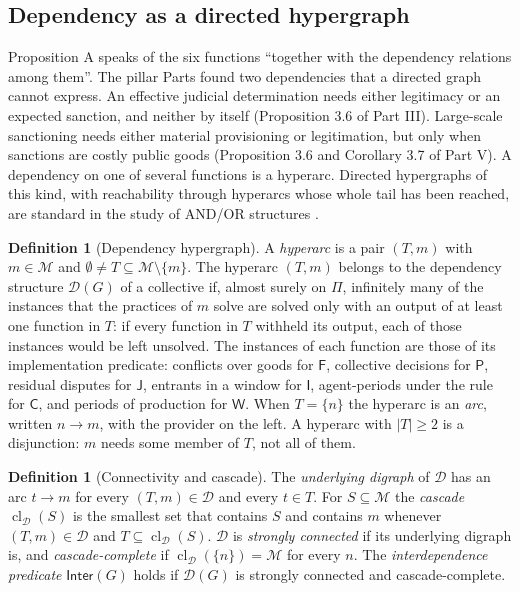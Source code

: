 \documentclass[11pt,letterpaper]{article}
\theoremstyle{definition}
\newtheorem{definition}[theorem]{Definition}
\theoremstyle{remark}
\newcommand{\pF}{\mathsf{F}}
\newcommand{\pP}{\mathsf{P}}
\newcommand{\pJ}{\mathsf{J}}
\newcommand{\pI}{\mathsf{I}}
\newcommand{\pC}{\mathsf{C}}
\newcommand{\pW}{\mathsf{W}}
\newcommand{\Mset}{\mathcal{M}}
\newcommand{\Inter}{\mathsf{Inter}}
\newcommand{\cl}{\operatorname{cl}}
\begin{document}
\subsection{Dependency as a directed hypergraph}

Proposition A speaks of the six functions ``together with the dependency relations among them''. The pillar Parts found two dependencies that a directed graph cannot express. An effective judicial determination needs either legitimacy or an expected sanction, and neither by itself (Proposition 3.6 of Part III). Large-scale sanctioning needs either material provisioning or legitimation, but only when sanctions are costly public goods (Proposition 3.6 and Corollary 3.7 of Part V). A dependency on one of several functions is a hyperarc. Directed hypergraphs of this kind, with reachability through hyperarcs whose whole tail has been reached, are standard in the study of AND/OR structures \citep{gallo1993}.

\begin{definition}[Dependency hypergraph]
\label{def:formalized-state:hypergraph}
A \emph{hyperarc} is a pair $(T,m)$ with $m\in\Mset$ and $\emptyset\neq T\subseteq\Mset\setminus\{m\}$. The hyperarc $(T,m)$ belongs to the dependency structure $\mathcal{D}(G)$ of a collective if, almost surely on $\Pi$, infinitely many of the instances that the practices of $m$ solve are solved only with an output of at least one function in $T$: if every function in $T$ withheld its output, each of those instances would be left unsolved. The instances of each function are those of its implementation predicate: conflicts over goods for $\pF$, collective decisions for $\pP$, residual disputes for $\pJ$, entrants in a window for $\pI$, agent-periods under the rule for $\pC$, and periods of production for $\pW$. When $T=\{n\}$ the hyperarc is an \emph{arc}, written $n\to m$, with the provider on the left. A hyperarc with $|T|\ge2$ is a disjunction: $m$ needs some member of $T$, not all of them.
\end{definition}

\begin{definition}[Connectivity and cascade]
\label{def:formalized-state:cascade}
The \emph{underlying digraph} of $\mathcal{D}$ has an arc $t\to m$ for every $(T,m)\in\mathcal{D}$ and every $t\in T$. For $S\subseteq\Mset$ the \emph{cascade} $\cl_{\mathcal{D}}(S)$ is the smallest set that contains $S$ and contains $m$ whenever $(T,m)\in\mathcal{D}$ and $T\subseteq\cl_{\mathcal{D}}(S)$. $\mathcal{D}$ is \emph{strongly connected} if its underlying digraph is, and \emph{cascade-complete} if $\cl_{\mathcal{D}}(\{n\})=\Mset$ for every $n$. The \emph{interdependence predicate} $\Inter(G)$ holds if $\mathcal{D}(G)$ is strongly connected and cascade-complete.
\end{definition}
\end{document}
